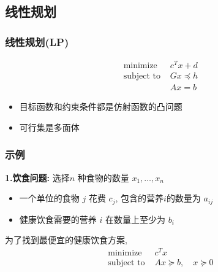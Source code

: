 \documentclass[handout]{beamer}
\begin{document}
\begin{frame}
	\subsection{线性规划}
	\begin{frame}
		\frametitle{线性规划(LP)}
		\begin{equation}
			\begin{array}{ll}
				\text { minimize } & c^{T} x+d \\
				\text { subject to } & G x \preceq h \\
				& A x=b
			\end{array}
		\end{equation}
		\begin{itemize}[<+->]
			\item 目标函数和约束条件都是仿射函数的凸问题
			\item 可行集是多面体
		\end{itemize}
	\end{frame}
	\begin{frame}
		\frametitle{示例}
		\textbf{1.饮食问题:} 选择$n$ 种食物的数量  $x_{1}, \ldots, x_{n}$
		\begin{itemize}
			\item 一个单位的食物 $j$ 花费 $c_{j}$, 包含的营养$i$的数量为 $a_{i j}$ 
			\item 健康饮食需要的营养 $i$ 在数量上至少为 $b_{i}$
		\end{itemize}
		为了找到最便宜的健康饮食方案,
		\begin{equation}
			\begin{array}{ll}
				\text{ minimize } & c^{T} x \\
				\text { subject to } & A x \succeq b, \quad x \succeq 0
			\end{array}
		\end{equation}
		\\
\end{frame}
\end{frame}
\end{document}
